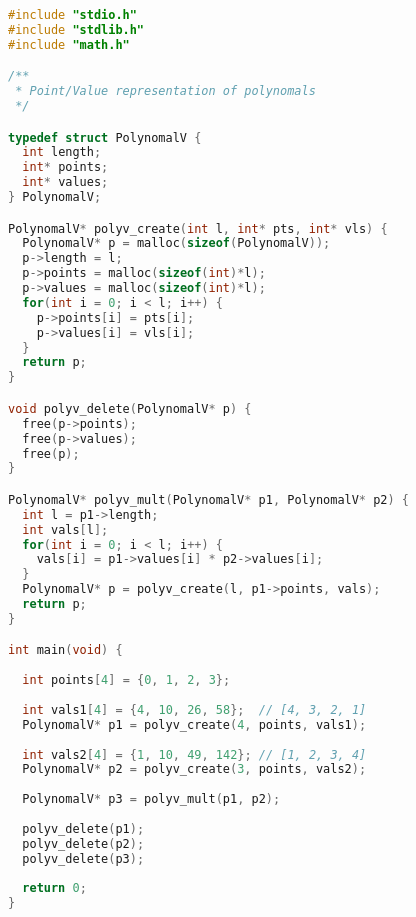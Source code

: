 \begin{lstlisting}[language=c]
#include "stdio.h"
#include "stdlib.h"
#include "math.h"

/**
 * Point/Value representation of polynomals
 */

typedef struct PolynomalV {
  int length;
  int* points;
  int* values;
} PolynomalV;

PolynomalV* polyv_create(int l, int* pts, int* vls) {
  PolynomalV* p = malloc(sizeof(PolynomalV));
  p->length = l;
  p->points = malloc(sizeof(int)*l);
  p->values = malloc(sizeof(int)*l);
  for(int i = 0; i < l; i++) {
    p->points[i] = pts[i];
    p->values[i] = vls[i];
  }
  return p;
}

void polyv_delete(PolynomalV* p) {
  free(p->points);
  free(p->values);
  free(p);
}

PolynomalV* polyv_mult(PolynomalV* p1, PolynomalV* p2) {
  int l = p1->length;
  int vals[l];
  for(int i = 0; i < l; i++) {
    vals[i] = p1->values[i] * p2->values[i];
  }
  PolynomalV* p = polyv_create(l, p1->points, vals);
  return p;
}

int main(void) {
  
  int points[4] = {0, 1, 2, 3};
  
  int vals1[4] = {4, 10, 26, 58};  // [4, 3, 2, 1]
  PolynomalV* p1 = polyv_create(4, points, vals1);
  
  int vals2[4] = {1, 10, 49, 142}; // [1, 2, 3, 4]
  PolynomalV* p2 = polyv_create(3, points, vals2);
  
  PolynomalV* p3 = polyv_mult(p1, p2);
  
  polyv_delete(p1);
  polyv_delete(p2);
  polyv_delete(p3);
  
  return 0;
}
\end{lstlisting}

